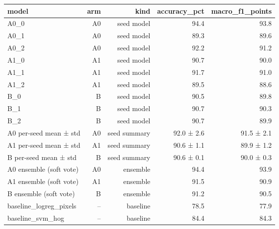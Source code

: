 \begin{tabular}{lrrrr}
\toprule
model & arm & kind & accuracy\_pct & macro\_f1\_points \\
\midrule
A0\_0 & A0 & seed model & 94.4 & 93.8 \\
A0\_1 & A0 & seed model & 89.3 & 89.6 \\
A0\_2 & A0 & seed model & 92.2 & 91.2 \\
A1\_0 & A1 & seed model & 90.7 & 90.0 \\
A1\_1 & A1 & seed model & 91.7 & 91.0 \\
A1\_2 & A1 & seed model & 89.5 & 88.6 \\
B\_0 & B & seed model & 90.5 & 89.8 \\
B\_1 & B & seed model & 90.7 & 90.3 \\
B\_2 & B & seed model & 90.7 & 89.9 \\
A0 per-seed mean ± std & A0 & seed summary & 92.0 ± 2.6 & 91.5 ± 2.1 \\
A1 per-seed mean ± std & A1 & seed summary & 90.6 ± 1.1 & 89.9 ± 1.2 \\
B per-seed mean ± std & B & seed summary & 90.6 ± 0.1 & 90.0 ± 0.3 \\
A0 ensemble (soft vote) & A0 & ensemble & 94.4 & 93.9 \\
A1 ensemble (soft vote) & A1 & ensemble & 91.5 & 90.9 \\
B ensemble (soft vote) & B & ensemble & 91.2 & 90.5 \\
baseline\_logreg\_pixels & -- & baseline & 78.5 & 77.9 \\
baseline\_svm\_hog & -- & baseline & 84.4 & 84.3 \\
\bottomrule
\end{tabular}
